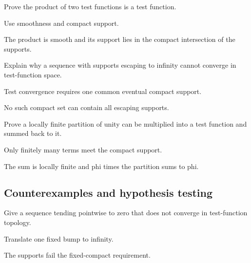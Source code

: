 \begin{exercise}\label{exr:iii15-expand-07}
Prove the product of two test functions is a test function.
\end{exercise}
\begin{hint}
Use smoothness and compact support.
\end{hint}
\begin{solution}
The product is smooth and its support lies in the compact intersection of the supports.
\end{solution}

\begin{exercise}\label{exr:iii15-expand-08}
Explain why a sequence with supports escaping to infinity cannot converge in test-function space.
\end{exercise}
\begin{hint}
Test convergence requires one common eventual compact support.
\end{hint}
\begin{solution}
No such compact set can contain all escaping supports.
\end{solution}

\begin{exercise}\label{exr:iii15-expand-09}
Prove a locally finite partition of unity can be multiplied into a test function and summed back to it.
\end{exercise}
\begin{hint}
Only finitely many terms meet the compact support.
\end{hint}
\begin{solution}
The sum is locally finite and phi times the partition sums to phi.
\end{solution}

\subsection*{Counterexamples and hypothesis testing}

\begin{exercise}\label{exr:iii15-expand-10}
Give a sequence tending pointwise to zero that does not converge in test-function topology.
\end{exercise}
\begin{hint}
Translate one fixed bump to infinity.
\end{hint}
\begin{solution}
The supports fail the fixed-compact requirement.
\end{solution}

